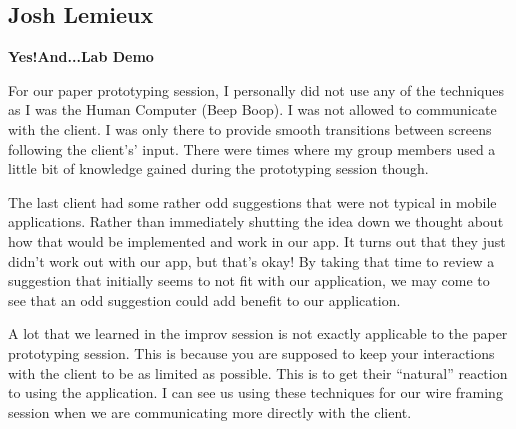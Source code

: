 \documentclass[12pt,letterpaper]{article}
\begin{document}
\clearpage
\subsection{Josh Lemieux}
\textbf{Yes!And...Lab Demo}\par
For our paper prototyping session, I personally did not use any of the techniques as I was the Human Computer (Beep Boop). I was not allowed to communicate with the client. I was only there to provide smooth transitions between screens following the client's’ input. There were times where my group members used a little bit of knowledge gained during the prototyping session though.\par
	The last client had some rather odd suggestions that were not typical in mobile applications. Rather than immediately shutting the idea down we thought about how that would be implemented and work in our app. It turns out that they just didn’t work out with our app, but that’s okay! By taking that time to review a suggestion that initially seems to not fit with our application, we may come to see that an odd suggestion could add benefit to our application.\par
      	A lot that we learned in the improv session is not exactly applicable to the paper prototyping session. This is because you are supposed to keep your interactions with the client to be as limited as possible. This is to get their “natural” reaction to using the application. I can see us using these techniques for our wire framing session when we are communicating more directly with the client.


\clearpage
\end{document}
